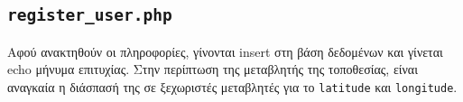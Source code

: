     \subsection{\texttt{register\_user.php}}
        Αφού ανακτηθούν οι πληροφορίες, γίνονται insert στη βάση δεδομένων και γίνεται echo μήνυμα επιτυχίας.
        Στην περίπτωση της μεταβλητής της τοποθεσίας, είναι αναγκαία η διάσπασή της σε ξεχωριστές μεταβλητές για το \texttt{latitude} και \texttt{longitude}.

